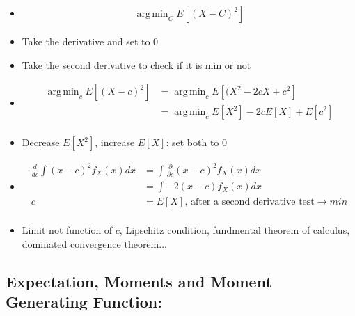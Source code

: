 \documentclass[11pt,letterpaper,titlepage]{article}
\DeclareMathOperator*{\argmin}{arg\,min}
\begin{document}
\begin{itemize}
    \item 
    
    \begin{equation*}
        \begin{aligned}
            \argmin_C E[(X-C)^2]
        \end{aligned}
    \end{equation*}
    
    \item Take the derivative and set to 0
    
    \item Take the second derivative to check if it is min or not
    
    \item
    
    \begin{equation*}
        \begin{aligned}
            \argmin_c E[(X-c)^2] &= \argmin_c E[(X^2 - 2cX + c^2] \\
            &= \argmin_c E[X^2] - 2cE[X] + E[c^2] \\
        \end{aligned}
    \end{equation*}
    
    \item Decrease $E[X^2]$, increase $E[X]$: set both to 0
    
    \item
    
     \begin{equation*}
        \begin{aligned}
            \frac{d}{dc} \int (x-c)^2 f_X(x) dx &= \int \frac{\partial}{\partial c} (x-c)^2 f_X(x)dx \\
            &= \int -2(x-c) f_X(x) dx \\
            c &= E[X] \text{, after a second derivative test} \rightarrow min\\
        \end{aligned}
    \end{equation*}
    
    \item Limit not function of $c$, Lipschitz condition, fundmental theorem of calculus, dominated convergence theorem...
    
\end{itemize}

\subsection{Expectation, Moments and Moment Generating Function:}
\end{document}
